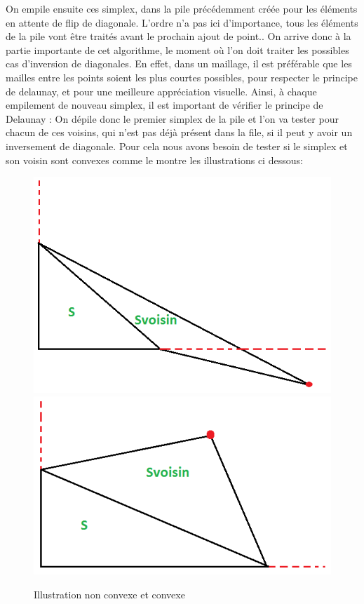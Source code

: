 \documentclass[10pt,a4paper]{report}
\begin{document}
On empile ensuite ces simplex, dans la pile précédemment créée pour les éléments en attente de flip de diagonale. L'ordre n'a pas ici d'importance, tous les éléments de la pile vont être traités avant le prochain ajout de point..
\newline \newline
\hspace*{10mm}On arrive donc à la partie importante de cet algorithme, le moment où l'on doit traiter les possibles cas d'inversion de diagonales. En effet, dans un maillage, il est préférable que les mailles entre les points soient les plus courtes possibles, pour respecter le principe de delaunay, et pour une meilleure appréciation visuelle. Ainsi, à chaque empilement de nouveau simplex, il est important de vérifier le principe de Delaunay : 
On dépile donc le premier simplex de la pile et l'on va tester pour chacun de ces voisins, qui n'est pas déjà présent dans la file, si il peut y avoir un inversement de diagonale. Pour cela nous avons besoin de tester si le simplex et son voisin sont convexes comme le montre les illustrations ci dessous:

\begin{figure}[h]
	\begin{center}
  		\includegraphics[scale=0.5]{DivisionDiagImpossible.png} 
  		\includegraphics[scale=0.5]{DivisionDiagPossible.png} 
  	\end{center}
   	\caption{Illustration non convexe et convexe}
	\label{Illustration non convexe}
\end{figure}
\end{document}
